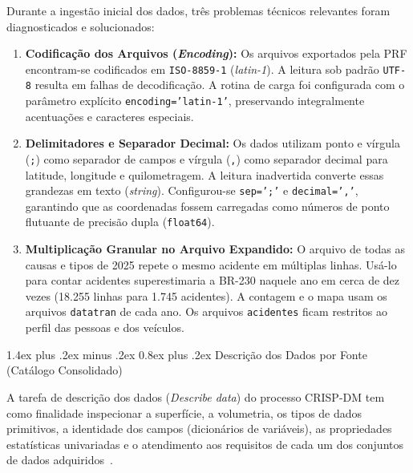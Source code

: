 \documentclass[11pt,a4paper]{article}
\makeatletter
\renewcommand\section{
\@startsection{section}{1}{0pt}%
{1.4ex plus .2ex minus .2ex}%
{0.8ex plus .2ex}%
{\normalfont\Large\bfseries\color{primary}}
}
\makeatother
\begin{document}
Durante a ingestão inicial dos dados, três problemas técnicos relevantes foram diagnosticados e solucionados:
\begin{enumerate}
    \item \textbf{Codificação dos Arquivos (\textit{Encoding}):} Os arquivos exportados pela PRF encontram-se codificados em \texttt{ISO-8859-1} (\textit{latin-1}). A leitura sob padrão \texttt{UTF-8} resulta em falhas de decodificação. A rotina de carga foi configurada com o parâmetro explícito \texttt{encoding='latin-1'}, preservando integralmente acentuações e caracteres especiais.
    \item \textbf{Delimitadores e Separador Decimal:} Os dados utilizam ponto e vírgula (\texttt{;}) como separador de campos e vírgula (\texttt{,}) como separador decimal para latitude, longitude e quilometragem. A leitura inadvertida converte essas grandezas em texto (\textit{string}). Configurou-se \texttt{sep=';'} e \texttt{decimal=','}, garantindo que as coordenadas fossem carregadas como números de ponto flutuante de precisão dupla (\texttt{float64}).
    \item \textbf{Multiplicação Granular no Arquivo Expandido:} O arquivo de todas as causas e tipos de 2025 repete o mesmo acidente em múltiplas linhas. Usá-lo para contar acidentes superestimaria a BR-230 naquele ano em cerca de dez vezes (18.255 linhas para 1.745 acidentes). A contagem e o mapa usam os arquivos \texttt{datatran} de cada ano. Os arquivos \texttt{acidentes} ficam restritos ao perfil das pessoas e dos veículos.
\end{enumerate}

\newpage

\section{Descrição dos Dados por Fonte (Catálogo Consolidado)}

A tarefa de descrição dos dados (\textit{Describe data}) do processo CRISP-DM tem como finalidade inspecionar a superfície, a volumetria, os tipos de dados primitivos, a identidade dos campos (dicionários de variáveis), as propriedades estatísticas univariadas e o atendimento aos requisitos de cada um dos conjuntos de dados adquiridos~\cite{chapman2000}.
\end{document}

